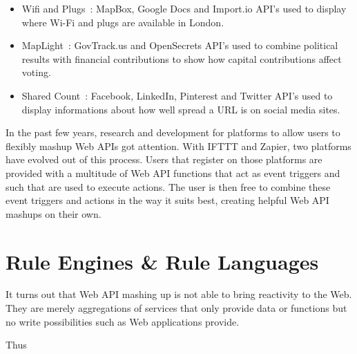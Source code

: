 \begin{itemize}
  \item Wifi and Plugs~\cite{wwwWifiAndPlugs}: MapBox, Google Docs and Import.io API's used to display where Wi-Fi and plugs are available in London.
  \item MapLight~\cite{wwwMapLight}: GovTrack.us and OpenSecrets API's used to combine political results with financial contributions to show how capital contributions affect voting.
  \item Shared Count~\cite{wwwSharedCount}: Facebook, LinkedIn, Pinterest and Twitter API's used to display informations about how well spread a URL is on social media sites.
\end{itemize}

In the past few years, research and development for platforms to allow users to flexibly mashup Web APIs got attention.
With IFTTT and Zapier, two platforms have evolved out of this process.
Users that register on those platforms are provided with a multitude of Web API functions that act as event triggers and such that are used to execute actions.
The user is then free to combine these event triggers and actions in the way it suits best, creating helpful Web API mashups on their own.




\section{Rule Engines \& Rule Languages}

It turns out that Web API mashing up is not able to bring reactivity to the Web.
They are merely aggregations of services that only provide data or functions but no write possibilities such as Web applications provide.

Thus 





